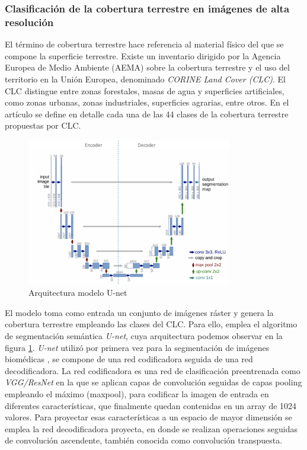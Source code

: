 \subsubsection{Clasificación de la cobertura terrestre en imágenes de alta resolución}
El término de cobertura terrestre hace referencia al material físico del que se compone la superficie terrestre. 
Existe un inventario dirigido por la Agencia Europea de Medio Ambiente (AEMA) sobre la cobertura terrestre y el uso del territorio en la Unión Europea, denominado \textit{CORINE Land Cover (CLC)}.
El CLC distingue entre zonas forestales, masas de agua y superficies artificiales, como zonas urbanas, zonas industriales, superficies agrarias, entre otros. 
En el artículo \cite{CLC} se define en detalle cada una de las 44 clases de la cobertura terrestre propuestas por CLC. 

\begin{figure}[H]
    \centering
    \includegraphics[width=0.80\textwidth]{Imagenes/GeoAI/unet.png}
    \caption{Arquitectura modelo U-net} \label{fig:u-net}
\end{figure}

El modelo toma como entrada un conjunto de imágenes ráster y genera la cobertura terrestre empleando las clases del CLC. 
Para ello, emplea el algoritmo de segmentación semántica \textit{U-net}, cuya arquitectura podemos observar en la figura \ref{fig:u-net}.
\textit{U-net} utilizó por primera vez para la segmentación de imágenes biomédicas \cite{Ronneberger2015}, se compone de una red codificadora seguida de una red decodificadora.
La red codificadora es una red de clasificación preentrenada como \textit{VGG/ResNet} en la que se aplican capas de convolución seguidas de capas pooling empleando el máximo (maxpool),
para codificar la imagen de entrada en diferentes características, que finalmente quedan contenidas en un array de 1024 valores.
Para proyectar esas características a un espacio de mayor dimensión se emplea la red decodificadora proyecta, 
en donde se realizan operaciones seguidas de convolución ascendente, también conocida como convolución transpuesta. 

